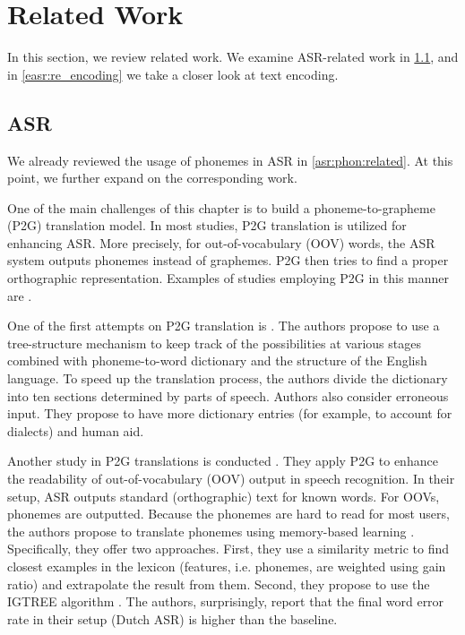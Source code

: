 \section{Related Work}
\label{easr:related}
In this section, we review related work. We examine ASR-related work in \cref{easr:rel_asr}, and in \cref{easr:re_encoding} we take a closer look at text encoding.

\subsection{ASR}
\label{easr:rel_asr}
We already reviewed the usage of phonemes in ASR in \cref{asr:phon:related}. At this point, we further expand on the corresponding work.

One of the main challenges of this chapter is to build a phoneme-to-grapheme (P2G) translation model. In most studies, P2G translation is utilized for enhancing ASR. More precisely, for out-of-vocabulary (OOV) words, the ASR system outputs phonemes instead of graphemes. P2G then tries to find a proper orthographic representation. Examples of studies employing P2G in this manner are .

One of the first attempts on P2G translation is . The authors propose to use a tree-structure mechanism to keep track of the possibilities at various stages combined with phoneme-to-word dictionary and the structure of the English language. To speed up the translation process, the authors divide the dictionary into ten sections determined by parts of speech. Authors also consider erroneous input. They propose to have more dictionary entries (for example, to account for dialects) and human aid.

Another study in P2G translations is conducted . They apply P2G to enhance the readability of out-of-vocabulary (OOV) output in speech recognition. In their setup, ASR outputs standard (orthographic) text for known words. For OOVs, phonemes are outputted. Because the phonemes are hard to read for most users, the authors propose to translate phonemes using memory-based learning . Specifically, they offer two approaches. First, they use a similarity metric to find closest examples in the lexicon (features, i.e. phonemes, are weighted using gain ratio) and extrapolate the result from them. Second, they propose to use the IGTREE algorithm . The authors, surprisingly, report that the final word error rate in their setup (Dutch ASR) is higher than the baseline.

